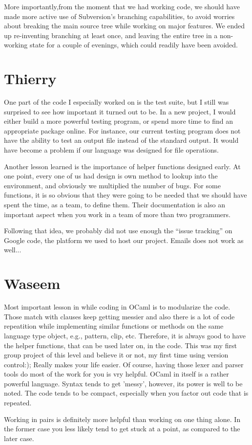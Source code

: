More importantly,from the moment that we had working code, we should have made more active use
of Subversion's branching capabilities, to avoid worries about breaking the main source tree while working on major features.  We ended up re-inventing branching at least once, and leaving the entire 
tree in a non-working state for a couple of evenings, which could readily have been avoided.


\section{Thierry}
One part of the code I especially worked on is the test suite, but I still
was surprised to see how important it turned out to be. In a new project,
I would either build a more powerful testing program, or spend more
time to find an appropriate package online. For instance, our current
testing program does not have the ability to test an output file instead
of the standard output. It would have become a problem if our language was
designed for file operations.

Another lesson learned is the importance of helper functions designed early.
At one point, every one of us had design is own method to lookup into the
environment, and obviously we multiplied the number of bugs. For some
functions, it is so obvious that they were going to be needed that we should
have spent the time, as a team, to define them. Their documentation is
also an important aspect when you work in a team of more than two programmers.

Following that idea, we probably did not use enough the ``issue tracking''
on Google code, the platform we used to host our project. Emails does not
work as well...

\section{Waseem}

Most important lesson in while coding in OCaml is to modularize the code.
Those match with clauses keep getting messier and also there is a lot of code 
repeatition while implementing similar functions or methods on the same language 
type object, e.g., pattern, clip, etc. Therefore, it is always good to have the 
helper functions, that can be used later on, in the code. This was my first group
project of this level and believe it or not, my first time using version control:); 
Really makes your life easier. Of course, having those lexer and parser tools do 
most of the work for you is vry helpful. OCaml in itself is a rather powerful language. 
Syntax tends to get 'messy', however, its power is well to be noted. The code tends 
to be compact, especially when you factor out code that is repeated.

Working in pairs is definitely more helpful than working on one thing alone. In the former
case you less likely tend to get stuck at a point, as compared to the later case. 

